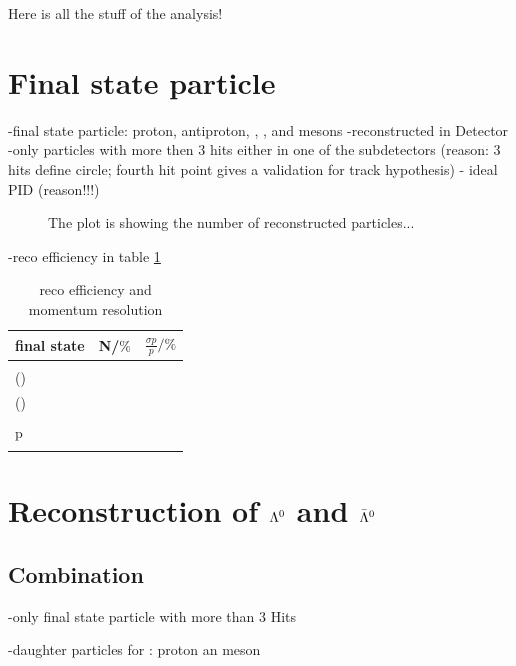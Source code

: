 Here is all the stuff of the analysis!

\section{Final state particle}
	-final state particle: proton, antiproton, \piminus, \piplus, \kminus and \kplus mesons
	-reconstructed in Detector
	-only particles with more then 3 hits either in one of the subdetectors (reason: 3 hits define circle; fourth hit point gives a validation for track hypothesis)
	- ideal PID (reason!!!)
		
	\begin{figure}
		\centering
		
		\caption{The plot is showing the number of reconstructed particles...}
		\label{fig:finalstate_allparticles}
	\end{figure}
	
	-reco efficiency in table \ref{tab:finalstate_recoeff}
	
	\begin{table}
		\centering
		\caption{reco efficiency and momentum resolution}
		\label{tab:finalstate_recoeff}
		\begin{tabular}{lll}
			\hline
			final state & N/$\%$ & $\frac{\sigma p}{p}/\%$ \\
			\hline
			\hline
			\piminus &  & \\
			\piplusone(\anticascade) &  & \\
			\piplustwo(\alam) &  &\\
			\kminus&  &\\
			p &  &\\
			\antiproton &  &\\\hline
			 
		\end{tabular}
	\end{table}
	

	
\section{Reconstruction of $\boldmath{\Lambda}^0$ and $\boldmath{\bar{\Lambda}^0}$}
	\subsection{Combination}
		-only final state particle with more than 3 Hits
		
		-daughter particles for \lam: proton an \piminus meson
		

